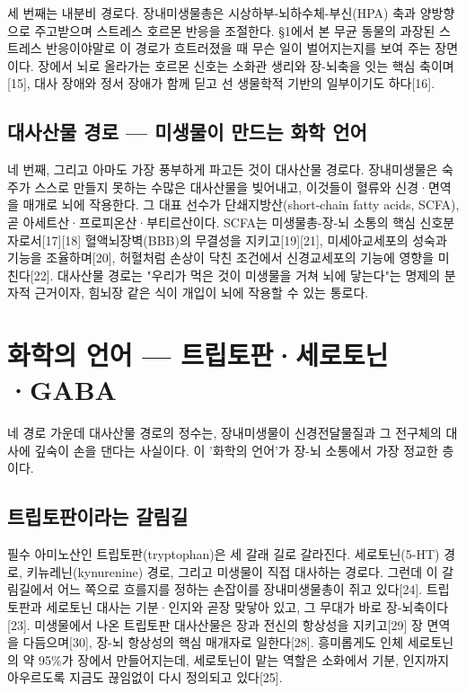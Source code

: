\documentclass[12pt,oneside]{book}
\begin{document}
세 번째는 내분비 경로다. 장내미생물총은 시상하부-뇌하수체-부신(HPA) 축과 양방향으로 주고받으며 스트레스 호르몬 반응을 조절한다. §1에서 본 무균 동물의 과장된 스트레스 반응이야말로 이 경로가 흐트러졌을 때 무슨 일이 벌어지는지를 보여 주는 장면이다. 장에서 뇌로 올라가는 호르몬 신호는 소화관 생리와 장-뇌축을 잇는 핵심 축이며[15], 대사 장애와 정서 장애가 함께 딛고 선 생물학적 기반의 일부이기도 하다[16].

\subsection{대사산물 경로 — 미생물이 만드는 화학 언어}

네 번째, 그리고 아마도 가장 풍부하게 파고든 것이 대사산물 경로다. 장내미생물은 숙주가 스스로 만들지 못하는 수많은 대사산물을 빚어내고, 이것들이 혈류와 신경·면역을 매개로 뇌에 작용한다. 그 대표 선수가 단쇄지방산(short-chain fatty acids, SCFA), 곧 아세트산·프로피온산·부티르산이다. SCFA는 미생물총-장-뇌 소통의 핵심 신호분자로서[17][18] 혈액뇌장벽(BBB)의 무결성을 지키고[19][21], 미세아교세포의 성숙과 기능을 조율하며[20], 허혈처럼 손상이 닥친 조건에서 신경교세포의 기능에 영향을 미친다[22]. 대사산물 경로는 "우리가 먹은 것이 미생물을 거쳐 뇌에 닿는다"는 명제의 분자적 근거이자, 힘뇌장 같은 식이 개입이 뇌에 작용할 수 있는 통로다.

\section{화학의 언어 — 트립토판·세로토닌·GABA}

네 경로 가운데 대사산물 경로의 정수는, 장내미생물이 신경전달물질과 그 전구체의 대사에 깊숙이 손을 댄다는 사실이다. 이 '화학의 언어'가 장-뇌 소통에서 가장 정교한 층이다.

\subsection{트립토판이라는 갈림길}

필수 아미노산인 트립토판(tryptophan)은 세 갈래 길로 갈라진다. 세로토닌(5-HT) 경로, 키뉴레닌(kynurenine) 경로, 그리고 미생물이 직접 대사하는 경로다. 그런데 이 갈림길에서 어느 쪽으로 흐를지를 정하는 손잡이를 장내미생물총이 쥐고 있다[24]. 트립토판과 세로토닌 대사는 기분·인지와 곧장 맞닿아 있고, 그 무대가 바로 장-뇌축이다[23]. 미생물에서 나온 트립토판 대사산물은 장과 전신의 항상성을 지키고[29] 장 면역을 다듬으며[30], 장-뇌 항상성의 핵심 매개자로 일한다[28]. 흥미롭게도 인체 세로토닌의 약 95\%가 장에서 만들어지는데, 세로토닌이 맡는 역할은 소화에서 기분, 인지까지 아우르도록 지금도 끊임없이 다시 정의되고 있다[25].
\end{document}
